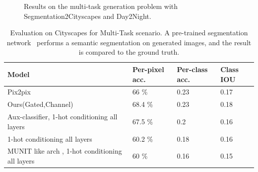 \begin{figure}
    \caption{Results on the multi-task generation problem with Segmentation2Cityscapes and Day2Night.}
    \label{fig:multi-task_day2night}
    \vspace{-3mm}
\end{figure}


\begin{table}[ht]
\caption{Evaluation on Cityscapes for Multi-Task scenario. A pre-trained segmentation network~\cite{} performs a semantic segmentation on generated images, and the result is compared to the ground truth.} %
\small
\centering %
\begin{tabular}{p{3cm}p{1cm}p{1cm}p{1cm}} %
\toprule
\textbf{Model} & \textbf{Per-pixel acc.} &  \textbf{Per-class acc.} & \textbf{Class IOU} \\%
\midrule
Pix2pix \cite{isola2016image2image} & 66 \%  & 0.23 & 0.17 \\ %
\midrule
Ours(Gated,Channel) & 68.4 \%  & 0.23 & 0.18 \\
\midrule
Aux-classifier, 1-hot conditioning all layers & 67.5 \% & 0.2 & 0.16 \\
\midrule
1-hot conditioning all layers & 60.2 \% & 0.18 & 0.16 \\
\midrule
MUNIT like arch , 1-hot conditioning all layers & 60 \% & 0.16 & 0.15 \\
\bottomrule %
\end{tabular}
\label{table:1d_G} %
\end{table}

